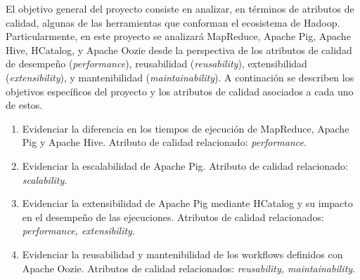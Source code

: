 El objetivo general del proyecto consiste en analizar, en términos de atributos de calidad, algunas de las herramientas que conforman el ecosistema de Hadoop. Particularmente, en este proyecto se analizará MapReduce, Apache Pig, Apache Hive, HCatalog, y Apache Oozie desde la perspectiva de los atributos de calidad de desempeño (\textit{performance}), reusabilidad (\textit{reusability}), extensibilidad (\textit{extensibility}), y mantenibilidad (\textit{maintainability}). A continación se describen los objetivos específicos del proyecto y los atributos de calidad asociados a cada uno de estos. \\

\begin{enumerate}

\item
{
Evidenciar la diferencia en los tiempos de ejecución de MapReduce, Apache Pig y Apache Hive. Atributo de calidad relacionado: \textit{performance}.
}

\item
{
Evidenciar la escalabilidad de Apache Pig. Atributo de calidad relacionado: \textit{scalability}.
}

\item
{
Evidenciar la extensibilidad de Apache Pig mediante HCatalog y su impacto en el desempeño de las ejecuciones. Atributos de calidad relacionados: \textit{performance, extensibility}.
}

\item
{
Evidenciar la reusabilidad y mantenibilidad de los workflows definidos con Apache Oozie. Atributos de calidad relacionados: \textit{reusability, maintainability}.
}

\end{enumerate}
